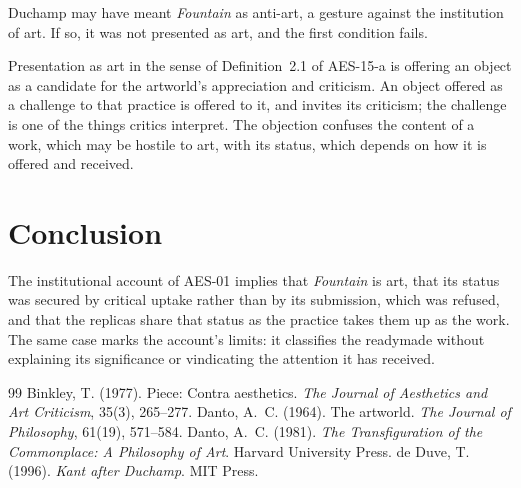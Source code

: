 \documentclass{situationist-preprint}
\begin{document}
\begin{objection}[Intention]\label{o:intent}
Duchamp may have meant \emph{Fountain} as anti-art, a gesture against the institution of art. If so, it was not presented as art, and the first condition fails.
\end{objection}

\begin{reply}
Presentation as art in the sense of Definition~2.1 of AES-15-a is offering an object as a candidate for the artworld's appreciation and criticism. An object offered as a challenge to that practice is offered to it, and invites its criticism; the challenge is one of the things critics interpret. The objection confuses the content of a work, which may be hostile to art, with its status, which depends on how it is offered and received.
\end{reply}

\section{Conclusion}

The institutional account of AES-01 implies that \emph{Fountain} is art, that its status was secured by critical uptake rather than by its submission, which was refused, and that the replicas share that status as the practice takes them up as the work. The same case marks the account's limits: it classifies the readymade without explaining its significance or vindicating the attention it has received.

\begin{thebibliography}{99}\small
{} Binkley, T. (1977). Piece: Contra aesthetics. \emph{The Journal of Aesthetics and Art Criticism}, 35(3), 265--277.
 Danto, A.~C. (1964). The artworld. \emph{The Journal of Philosophy}, 61(19), 571--584.
 Danto, A.~C. (1981). \emph{The Transfiguration of the Commonplace: A Philosophy of Art}. Harvard University Press.
 de Duve, T. (1996). \emph{Kant after Duchamp}. MIT Press.
\end{thebibliography}
\end{document}
